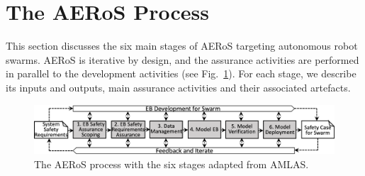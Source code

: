 \documentclass[runningheads]{llncs}
\begin{document}
\section{The AERoS Process}\label{framework}
This section discusses the six main stages of AERoS targeting autonomous robot swarms. AERoS is iterative by design, and the assurance activities are performed in parallel to the development activities (see Fig.~\ref{aeros-process}). For each stage, we describe its inputs and outputs, main assurance activities and their associated artefacts. 
\begin{figure}[!b]
	\centering
	\vspace{-3ex}
	\includegraphics[width=1.0\textwidth]{figures/AERoS-Process-v2.png}%
	\vspace{-3ex}
	\caption{The AERoS process with the six stages adapted from AMLAS.}%
	\label{aeros-process}
	\vspace{-4ex}
\end{figure}
%
\end{document}
